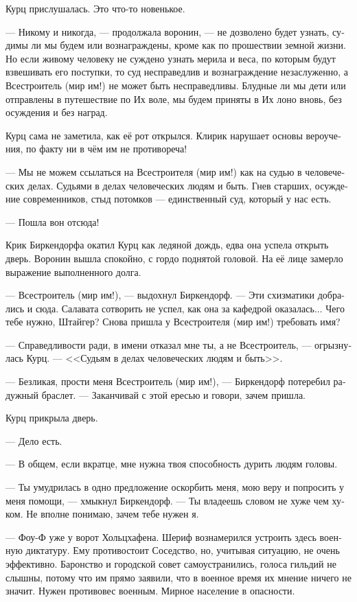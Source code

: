 \documentclass[a4paper,12pt,fleqn]{book}\usepackage{polyglossia}\setdefaultlanguage[babelshorthands=true]{russian}\setotherlanguage{english}\defaultfontfeatures{Ligatures=TeX,Mapping=tex-text}\usepackage{xcolor}\newcommand{\ml}[3]{#2}
\newcommand{\asterism}{\vspace{1em}{\centering\Large\bfseries$\ast~\ast~\ast$\par}\vspace{1em}}
\begin{document}
Курц прислушалась.
Это что-то новенькое.

--- Никому и никогда, --- продолжала воронин, --- не дозволено будет узнать, судимы ли мы будем или вознаграждены, кроме как по прошествии земной жизни.
Но если живому человеку не суждено узнать мерила и веса, по которым будут взвешивать его поступки, то суд несправедлив и вознаграждение незаслуженно, а Всестроитель (мир им!) не может быть несправедливы.
Блудные ли мы дети или отправлены в путешествие по Их воле, мы будем приняты в Их лоно вновь, без осуждения и без наград.

Курц сама не заметила, как её рот открылся.
Клирик нарушает основы вероучения, по факту ни в чём им не противореча!

--- Мы не можем ссылаться на Всестроителя (мир им!) как на судью в человеческих делах.
Судьями в делах человеческих людям и быть.
Гнев старших, осуждение современников, стыд потомков --- единственный суд, который у нас есть.

\asterism

--- Пошла вон отсюда!

Крик Биркендорфа окатил Курц как ледяной дождь, едва она успела открыть дверь.
Воронин вышла спокойно, с гордо поднятой головой.
На её лице замерло выражение выполненного долга.

--- Всестроитель (мир им!), --- выдохнул Биркендорф.
--- Эти схизматики добрались и сюда.
Салавата сотворить не успел, как она за кафедрой оказалась...
Чего тебе нужно, Штайгер?
Снова пришла у Всестроителя (мир им!) требовать имя?

--- Справедливости ради, в имени отказал мне ты, а не Всестроитель, --- огрызнулась Курц.
--- <<Судьям в делах человеческих людям и быть>>.

--- Безликая, прости меня Всестроитель (мир им!), --- Биркендорф потеребил радужный браслет.
--- Заканчивай с этой ересью и говори, зачем пришла.

Курц прикрыла дверь.

--- Дело есть.

\asterism

--- В общем, если вкратце, мне нужна твоя способность дурить людям головы.

--- Ты умудрилась в одно предложение оскорбить меня, мою веру и попросить у меня помощи, --- хмыкнул Биркендорф.
--- Ты владеешь словом не хуже чем хуком.
Не вполне понимаю, зачем тебе нужен я.

--- Фоу-Ф уже у ворот Хольцхафена.
Шериф вознамерился устроить здесь военную диктатуру.
Ему противостоит Соседство, но, учитывая ситуацию, не очень эффективно.
Баронство и городской совет самоустранились, голоса гильдий не слышны, потому что им прямо заявили, что в военное время их мнение ничего не значит.
Нужен противовес военным.
Мирное население в опасности.
\end{document}
